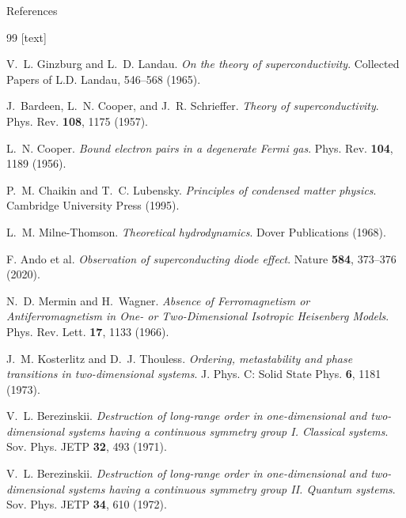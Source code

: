 \documentclass[aspectratio=169, 10pt]{beamer}
\begin{document}
\begin{frame}[allowframebreaks]{References}
  \begin{thebibliography}{99}
    [text]
    \fontsize{7.5}{9}\selectfont
    
    V.~L. Ginzburg and L.~D. Landau.
    \newblock \emph{On the theory of superconductivity}.
    \newblock Collected Papers of L.D. Landau, 546--568 (1965).

    J.~Bardeen, L.~N. Cooper, and J.~R. Schrieffer.
    \newblock \emph{Theory of superconductivity}.
    \newblock Phys. Rev. \textbf{108}, 1175 (1957).
    
    L.~N. Cooper.
    \newblock \emph{Bound electron pairs in a degenerate Fermi gas}.
    \newblock Phys. Rev. \textbf{104}, 1189 (1956).

    P.~M. Chaikin and T.~C. Lubensky.
    \newblock \emph{Principles of condensed matter physics}.
    \newblock Cambridge University Press (1995).

    L.~M. Milne-Thomson.
    \newblock \emph{Theoretical hydrodynamics}.
    \newblock Dover Publications (1968).

    F. Ando et al.
    \newblock \emph{Observation of superconducting diode effect}.
    \newblock Nature \textbf{584}, 373--376 (2020).

    N.~D. Mermin and H.~Wagner.
    \newblock \emph{Absence of Ferromagnetism or Antiferromagnetism in One- or Two-Dimensional Isotropic Heisenberg Models}.
    \newblock Phys. Rev. Lett. \textbf{17}, 1133 (1966).

    J.~M. Kosterlitz and D.~J. Thouless.
    \newblock \emph{Ordering, metastability and phase transitions in two-dimensional systems}.
    \newblock J. Phys. C: Solid State Phys. \textbf{6}, 1181 (1973).

    V.~L. Berezinskii.
    \newblock \emph{Destruction of long-range order in one-dimensional and two-dimensional systems having a continuous symmetry group I. Classical systems}.
    \newblock Sov. Phys. JETP \textbf{32}, 493 (1971).

    V.~L. Berezinskii.
    \newblock \emph{Destruction of long-range order in one-dimensional and two-dimensional systems having a continuous symmetry group II. Quantum systems}.
    \newblock Sov. Phys. JETP \textbf{34}, 610 (1972).


\end{thebibliography}
\end{frame}
\end{document}

